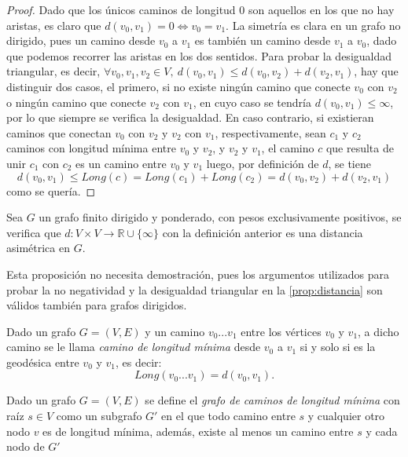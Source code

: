 \begin{proof}
	Dado que los únicos caminos de longitud $0$ son aquellos en los que no hay aristas, es claro que $d(v_0, v_1) = 0 \Leftrightarrow v_0 = v_1$. La simetría es clara en un grafo no dirigido, pues un camino desde $v_0$ a $v_1$ es también un camino desde $v_1$ a $v_0$, dado que podemos recorrer las aristas en los dos sentidos. Para probar la desigualdad triangular, es decir, $\forall v_0, v_1, v_2 \in V,\ d(v_0,v_1) \leq d(v_0,v_2) + d(v_2,v_1)$, hay que distinguir dos casos, el primero, si no existe ningún camino que conecte $v_0$ con $v_2$ o ningún camino que conecte $v_2$ con $v_1$, en cuyo caso se tendría $d(v_0,v_1)\leq \infty$, por lo que siempre se verifica la desigualdad. En caso contrario, si existieran caminos que conectan $v_0$ con $v_2$ y $v_2$ con $v_1$, respectivamente, sean $c_1$ y $c_2$ caminos con longitud mínima entre $v_0$ y $v_2$, y $v_2$ y $v_1$, el camino $c$ que resulta de unir $c_1$ con $c_2$ es un camino entre $v_0$ y $v_1$ luego, por definición de $d$, se tiene
	$$d(v_0, v_1) \leq Long(c) = Long(c_1)+Long(c_2)=d(v_0,v_2)+d(v_2,v_1)$$
	como se quería.
\end{proof}

\begin{proposicion}
	Sea $G$ un grafo finito dirigido y ponderado, con pesos exclusivamente positivos, se verifica que $d:V\times V \rightarrow \mathbb{R}\cup \{\infty\}$ con la definición anterior es una distancia asimétrica en $G$.
\end{proposicion}

Esta proposición no necesita demostración, pues los argumentos utilizados para probar la no negatividad y la desigualdad triangular en la \autoref{prop:distancia} son válidos también para grafos dirigidos.

\begin{definicion}
	Dado un grafo $G=(V,E)$ y un camino $v_0...v_1$ entre los vértices $v_0$ y $v_1$, a dicho camino se le llama \textit{camino de longitud mínima} desde $v_0$ a $v_1$ si y solo si es la geodésica entre $v_0$ y $v_1$, es decir:
	$$Long(v_0...v_1) = d(v_0, v_1).$$
\end{definicion}

\begin{definicion}
	Dado un grafo $G=(V,E)$ se define el \textit{grafo de caminos de longitud mínima} con raíz $s\in V$ como un subgrafo $G'$ en el que todo camino entre $s$ y cualquier otro nodo $v$ es de longitud mínima, además, existe al menos un camino entre $s$ y cada nodo de $G'$
\end{definicion}

